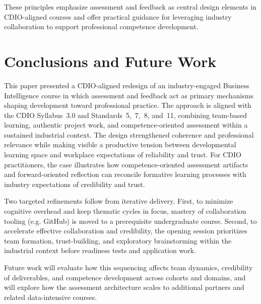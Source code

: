These principles emphasize assessment and feedback as central design elements in CDIO-aligned courses and offer practical guidance for leveraging industry collaboration to support professional competence development.

\section{Conclusions and Future Work}
This paper presented a CDIO-aligned redesign of an industry-engaged Business Intelligence course in which assessment and feedback act as primary mechanisms shaping development toward professional practice.
The approach is aligned with the CDIO Syllabus~3.0 and Standards~5,~7,~8, and~11, combining team-based learning, authentic project work, and competence-oriented assessment within a sustained industrial context. The design strengthened coherence and professional relevance while making visible a productive tension between developmental learning space and workplace expectations of reliability and trust. For CDIO practitioners, the case illustrates how competence-oriented assessment artifacts and forward-oriented reflection can reconcile formative learning processes with industry expectations of credibility and trust.

Two targeted refinements follow from iterative delivery. First, to minimize cognitive overhead and keep thematic cycles in focus, mastery of collaboration tooling (e.g. GitHub) is moved to a prerequisite undergraduate course. Second, to accelerate effective collaboration and credibility, the opening session prioritizes team formation, trust-building, and exploratory brainstorming within the industrial context before readiness tests and application work.

Future work will evaluate how this sequencing affects team dynamics, credibility of deliverables, and competence development across cohorts and domains, and will explore how the assessment architecture scales to additional partners and related data-intensive courses. 
